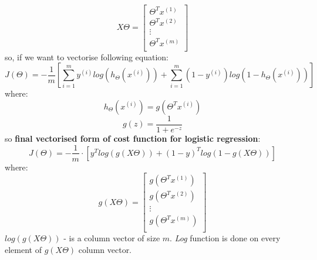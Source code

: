 \documentclass{article} %
\begin{document}
\begin{equation*}
X \Theta = 
\begin{bmatrix} 
\Theta^Tx^{(1)} \\ 
\Theta^Tx^{(2)} \\
\vdots \\
\Theta^Tx^{(m)}\\
\end{bmatrix}  
\end{equation*}
so, if we want to vectorise following equation:
\begin{equation}
J(\Theta) = - \frac{1}{m}
\left[
\sum_{i=1}^{m}y^{(i)}log(h_{\Theta}(x^{(i)}))+
\sum_{i=1}^{m}(1-y^{(i)})log(1-h_{\Theta}(x^{(i)})) 
\right]
\end{equation}
where:
\begin{equation*}
h_{\Theta}(x^{(i)}) = g(\Theta^Tx^{(i)})
\end{equation*}
\begin{equation*} 
g(z) = \frac{1}{1 + e^{-z}}  
\end{equation*}
\newline
so \textbf{final vectorised form of cost function for logistic regression}:
\begin{equation}
J(\Theta) = - \frac{1}{m}\cdot
\left[y^Tlog(g(X\Theta))+(1-y)^Tlog(1-g(X\Theta))\right]
\end{equation} 
where:
\begin{equation*} 
g(X\Theta) = 
\begin{bmatrix} 
g(\Theta^Tx^{(1)}) \\ 
g(\Theta^Tx^{(2)}) \\
\vdots \\
g(\Theta^Tx^{(m)})\\
\end{bmatrix}
\end{equation*} 
$log(g(X\Theta))$ - is a column vector of size $m$. \textit{Log} function is done on every element of $g(X\Theta)$ column vector.  
\end{document}
